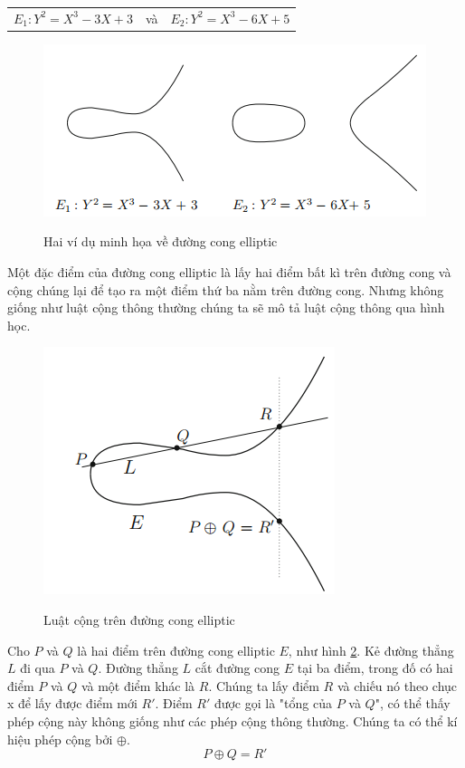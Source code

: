 \documentclass[a4paper,12pt]{report}
\newcounter{someCounter}
\begin{document}
\begin{center}
\begin{tabular}{ccc}
$E_1: Y^2 = X^3 - 3X + 3$ & và & $E_2: Y^2 = X^3 - 6X + 5$ 
\end{tabular}
\end{center}
\begin{figure}[h]
\begin{center}
\includegraphics[scale=0.95]{../im1.png} \label{h2.1}  
\caption{Hai ví dụ minh họa về đường cong elliptic}
\end{center}
\end{figure}
Một đặc điểm của đường cong elliptic là lấy hai điểm bất kì trên đường cong và cộng chúng lại để tạo ra một điểm thứ ba nằm trên đường cong. Nhưng không giống như luật cộng thông thường chúng ta sẽ mô tả luật cộng thông qua hình học.
\begin{figure}[h]
\begin{center}
\includegraphics[scale=1=0.95]{../im2.png} \label{h2.2} 
\caption{Luật cộng trên đường cong elliptic}
\end{center}
\end{figure}

Cho $P$ và $Q$ là hai điểm trên đường cong elliptic $E$, như hình \ref{h2.2}. Kẻ đường thẳng $L$ đi qua $P$ và $Q$. Đường thẳng $L$ cắt đường cong $E$ tại ba điểm, trong đố có hai điểm $P$ và $Q$ và một điểm khác là $R$. Chúng ta lấy điểm $R$ và chiếu nó theo chục x để lấy được điểm mới $R'$. Điểm $R'$ được gọi là "tổng của $P$ và $Q$", có thể thấy phép cộng này không giống như các phép cộng thông thường. Chúng ta có thể kí hiệu phép cộng bởi $\oplus$.
\begin{displaymath}
P \oplus Q = R'
\end{displaymath}
\end{document}
